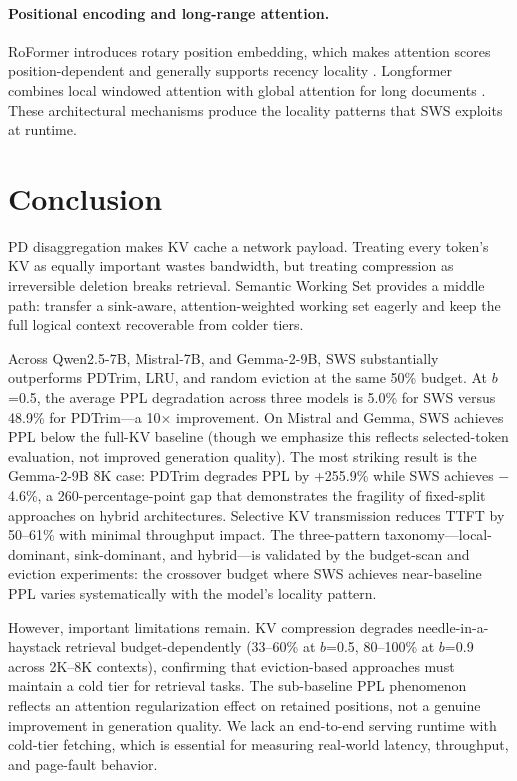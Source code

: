 \documentclass[11pt]{article}
\newcommand{\method}{SWS}
\newcommand{\fullmethod}{Semantic Working Set}
\newcommand{\sws}{SWS}
\newcommand{\pct}{\%}
\theoremstyle{definition}
\theoremstyle{plain}
\begin{document}
\paragraph{Positional encoding and long-range attention.}
RoFormer introduces rotary position embedding, which makes attention scores position-dependent and generally supports recency locality \citep{su2021roformer}.  Longformer combines local windowed attention with global attention for long documents \citep{longformer}.  These architectural mechanisms produce the locality patterns that \method{} exploits at runtime.

\section{Conclusion}
\label{sec:conclusion}

PD disaggregation makes KV cache a network payload.  Treating every token's KV as equally important wastes bandwidth, but treating compression as irreversible deletion breaks retrieval.  \fullmethod{} provides a middle path: transfer a sink-aware, attention-weighted working set eagerly and keep the full logical context recoverable from colder tiers.

Across Qwen2.5-7B, Mistral-7B, and Gemma-2-9B, \method{} substantially outperforms PDTrim, LRU, and random eviction at the same 50\pct{} budget.  At $b$=0.5, the average PPL degradation across three models is 5.0\pct{} for \sws{} versus 48.9\pct{} for PDTrim---a 10$\times$ improvement.  On Mistral and Gemma, \sws{} achieves PPL below the full-KV baseline (though we emphasize this reflects selected-token evaluation, not improved generation quality).  The most striking result is the Gemma-2-9B 8K case: PDTrim degrades PPL by +255.9\pct{} while \sws{} achieves $-$4.6\pct{}, a 260-percentage-point gap that demonstrates the fragility of fixed-split approaches on hybrid architectures.  Selective KV transmission reduces TTFT by 50--61\pct{} with minimal throughput impact.  The three-pattern taxonomy---local-dominant, sink-dominant, and hybrid---is validated by the budget-scan and eviction experiments: the crossover budget where \sws{} achieves near-baseline PPL varies systematically with the model's locality pattern.

However, important limitations remain.  KV compression degrades needle-in-a-haystack retrieval budget-dependently (33--60\pct{} at $b$=0.5, 80--100\pct{} at $b$=0.9 across 2K--8K contexts), confirming that eviction-based approaches must maintain a cold tier for retrieval tasks.  The sub-baseline PPL phenomenon reflects an attention regularization effect on retained positions, not a genuine improvement in generation quality.  We lack an end-to-end serving runtime with cold-tier fetching, which is essential for measuring real-world latency, throughput, and page-fault behavior.
\end{document}
